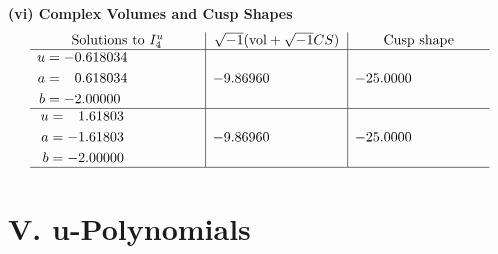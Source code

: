 \documentclass[1p]{elsarticle_modified}
\theoremstyle{definition}
\newcommand{\I}{\sqrt{-1}}
\begin{document}
\newpage\flushleft \textbf{(vi) Complex Volumes and Cusp Shapes}
$$\begin{array}{c|c|c}  
\text{Solutions to }I^u_{4}& \I (\text{vol} + \sqrt{-1}CS) & \text{Cusp shape}\\
 \hline 
\begin{aligned}
u &= -0.618034\phantom{ +0.000000I} \\
a &= \phantom{-}0.618034\phantom{ +0.000000I} \\
b &= -2.00000\phantom{ +0.000000I}\end{aligned}
 & -9.86960\phantom{ +0.000000I} & -25.0000\phantom{ +0.000000I} \\ \hline\begin{aligned}
u &= \phantom{-}1.61803\phantom{ +0.000000I} \\
a &= -1.61803\phantom{ +0.000000I} \\
b &= -2.00000\phantom{ +0.000000I}\end{aligned}
 & -9.86960\phantom{ +0.000000I} & -25.0000\phantom{ +0.000000I}\\
 \hline 
 \end{array}$$\newpage
\newpage\renewcommand{\arraystretch}{1}
\centering \section*{ V. u-Polynomials}
\end{document}
